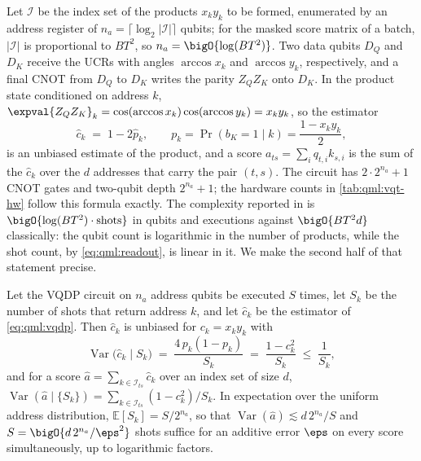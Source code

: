 Let $\mathcal{I}$ be the index set of the products $x_k y_k$ to be formed, enumerated by an address register of $n_a = \lceil \log_2 |\mathcal{I}| \rceil$ qubits; for the masked score matrix of a batch, $|\mathcal{I}|$ is proportional to $BT^2$, so $n_a = \bigO{\log(BT^2)}$. Two data qubits $D_Q$ and $D_K$ receive the UCRs with angles $\arccos x_k$ and $\arccos y_k$, respectively, and a final CNOT from $D_Q$ to $D_K$ writes the parity $Z_Q Z_K$ onto $D_K$. In the product state conditioned on address $k$, $\expval{Z_Q Z_K}_k = \cos(\arccos x_k)\cos(\arccos y_k) = x_k y_k$, so the estimator
\begin{equation}\label{eq:qml:vqdp}
\hat{c}_k \;=\; 1 - 2\hat{p}_k, \qquad p_k = \Pr(b_K = 1 \mid k) = \frac{1 - x_k y_k}{2},
\end{equation}
is an unbiased estimate of the product, and a score $a_{ts} = \sum_{i} q_{t,i} k_{s,i}$ is the sum of the $\hat{c}_k$ over the $d$ addresses that carry the pair $(t,s)$. The circuit has $2 \cdot 2^{n_a} + 1$ CNOT gates and two-qubit depth $2^{n_a} + 1$; the hardware counts in \cref{tab:qml:vqt-hw} follow this formula exactly. The complexity reported in \cite{guo2025vqt} is $\bigO{\log(BT^2)\cdot \text{shots}}$ in qubits and executions against $\bigO{BT^2 d}$ classically: the qubit count is logarithmic in the number of products, while the shot count, by \cref{eq:qml:readout}, is linear in it. We make the second half of that statement precise.

\begin{proposition}\label{thm:qml:vqdp-variance}
Let the VQDP circuit on $n_a$ address qubits be executed $S$ times, let $S_k$ be the number of shots that return address $k$, and let $\hat{c}_k$ be the estimator of \cref{eq:qml:vqdp}. Then $\hat{c}_k$ is unbiased for $c_k = x_k y_k$ with
\begin{equation}\label{eq:qml:vqdp-var}
\operatorname{Var}\big(\hat{c}_k \mid S_k\big) \;=\; \frac{4\,p_k(1-p_k)}{S_k} \;=\; \frac{1 - c_k^2}{S_k} \;\le\; \frac{1}{S_k},
\end{equation}
and for a score $\hat{a} = \sum_{k \in \mathcal{I}_{ts}} \hat{c}_k$ over an index set of size $d$,
$\operatorname{Var}(\hat{a} \mid \{S_k\}) = \sum_{k \in \mathcal{I}_{ts}} (1 - c_k^2)/S_k$. In expectation over the uniform address distribution, $\mathbb{E}[S_k] = S/2^{n_a}$, so that $\operatorname{Var}(\hat{a}) \lesssim d\,2^{n_a}/S$ and $S = \bigO{d\,2^{n_a}/\eps^2}$ shots suffice for an additive error $\eps$ on every score simultaneously, up to logarithmic factors.
\end{proposition}

